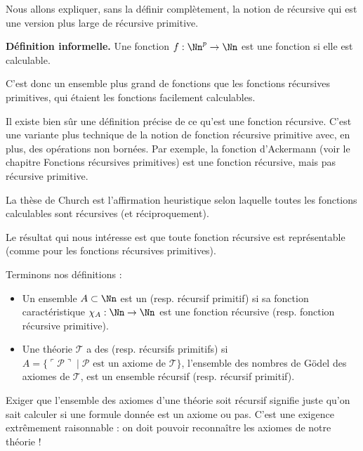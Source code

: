 \documentclass[11pt,class=report,crop=false]{standalone}
\begin{document}
Nous allons expliquer, sans la définir complètement, la notion de \og{}récursive\fg{} qui est une version plus large de \og{}récursive primitive\fg{}.

\textbf{Définition informelle.}
Une fonction $f : \Nn^p \to \Nn$ est une fonction  si elle est calculable.

C'est donc un ensemble plus grand de fonctions que les fonctions récursives primitives, qui étaient les fonctions \og{}facilement calculables\fg{}.

Il existe bien sûr une définition précise de ce qu'est une fonction récursive. C'est une variante plus technique de la notion de fonction récursive primitive avec, en plus, des opérations non bornées. Par exemple, la fonction d'Ackermann (voir le chapitre \og{}Fonctions récursives primitives\fg{}) est une fonction récursive, mais pas récursive primitive. 

La \og{}thèse de Church\fg{} est l'affirmation heuristique selon laquelle toutes les fonctions calculables sont récursives (et réciproquement).

Le résultat qui nous intéresse est que toute fonction récursive est représentable (comme pour les fonctions récursives primitives).

Terminons nos définitions :

\begin{itemize}
    \item Un ensemble $A \subset \Nn$ est un  (resp. récursif primitif) si sa fonction caractéristique $\chi_A : \Nn \to \Nn$ est une fonction récursive (resp. fonction récursive primitive). 
    
    \item Une théorie $\mathcal{T}$ a des  (resp. récursifs primitifs) si $A = \{ \ulcorner \mathcal{P} \urcorner \mid \mathcal{P} \text{ est un axiome de } \mathcal{T} \}$, l'ensemble des nombres de Gödel des axiomes de $\mathcal{T}$, est un ensemble récursif (resp. récursif primitif).
\end{itemize}


Exiger que l'ensemble des axiomes d'une théorie soit récursif signifie juste qu'on sait calculer si une formule donnée est un axiome ou pas. C'est une exigence extrêmement raisonnable : on doit pouvoir reconnaître les axiomes de notre théorie !


\end{document}

